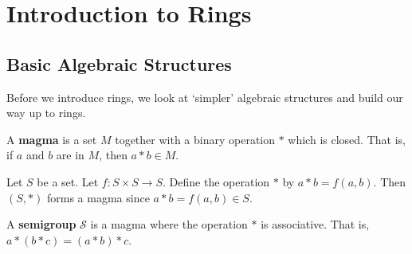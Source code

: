 
\usepackage{xr}

\newcommand{\version}{0.1}
\newcommand{\volumenumber}{2}
\newcommand{\volumename}{Rings}
\newcommand{\volumeimage}{cover/Integers.png}

\newcommand{\quotepagetext}{
    [Some] of the major discoveries in ring theory have helped shape the course of development of modern abstract algebra... A course in ring theory is an indispensable part of the education of any fledgling algebraist.
}
\newcommand{\quotepageattribution}{Tsit-Yuen Lam, 2001}
\newcommand{\quotepagecitation}{\cite{lam_2001}}

\newcommand{\prefacevolumetext}{
    This volume covers the basics of ring theory. %
}

\linespread{1.05}




\frontmatterpages

\chapter{Introduction to Rings}
\section{Basic Algebraic Structures}
Before we introduce rings, we look at `simpler' algebraic structures and build our way up to rings.

\begin{definition}
    A \textbf{magma} is a set $M$ together with a binary operation $\ast$ which is closed. That is, if $a$ and $b$ are in $M$, then $a \ast b \in M$.
\end{definition}

\begin{example}
    Let $S$ be a set. Let $f: S \times S \to S$. Define the operation $\ast$ by $a \ast b = f(a, b)$. Then $(S, \ast)$ forms a magma since $a\ast b = f(a,b) \in S$.
\end{example}

\begin{definition}
    A \textbf{semigroup} $\mathcal{S}$ is a magma where the operation $\ast$ is associative. That is, $a\ast(b\ast c) = (a\ast b)\ast c$.
\end{definition}

